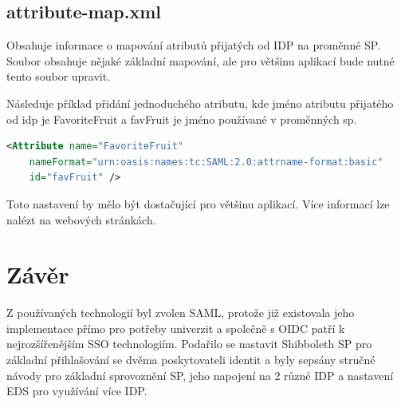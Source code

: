 \section{attribute-map.xml}
Obsahuje informace o mapování atributů přijatých od IDP na proměnné SP. Soubor obsahuje nějaké základní mapování, ale pro většinu aplikací bude nutné tento soubor upravit.

Následuje příklad přidání jednoduchého atributu, kde jméno atributu přijatého od idp je FavoriteFruit a favFruit je jméno používané v proměnných sp\cite{AddAttribute}.
 \begin{lstlisting}[language=XML]
     <Attribute name="FavoriteFruit"
    nameFormat="urn:oasis:names:tc:SAML:2.0:attrname-format:basic"
    id="favFruit" />
    \end{lstlisting}
    
Toto nastavení by mělo být dostačující pro většinu aplikací. Více informací lze nalézt na webových stránkách\cite{AddAttribute}.

\chapter{Závěr}
Z používaných technologií byl zvolen SAML, protože již existovala jeho implementace přímo pro potřeby univerzit a společně s OIDC patří k nejrozšířenějším SSO technologiím.
Podařilo se nastavit Shibboleth SP pro základní přihlašování se dvěma poskytovateli identit a byly sepsány stručné návody pro základní sprovoznění SP, jeho napojení na 2 různé IDP a nastavení EDS pro využívání více IDP.

\label{zaver}






